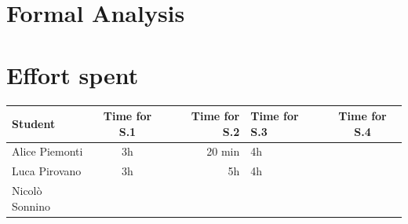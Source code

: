 \documentclass[table, 12pt]{article}
\begin{document}
\section{Formal Analysis}
\newpage
\section{Effort spent}
\begin{tabular}{ | l || c | r | l | c |}
    \hline
    Student        & Time for S.1 & Time for S.2 & Time for S.3 & Time for S.4 \\ \hline
    Alice Piemonti & 3h           & 20 min       & 4h           &              \\ \hline
    Luca Pirovano  & 3h           & 5h           & 4h           &              \\ \hline
    Nicolò Sonnino &              &              &              &              \\
    \hline
\end{tabular}
\end{document}

